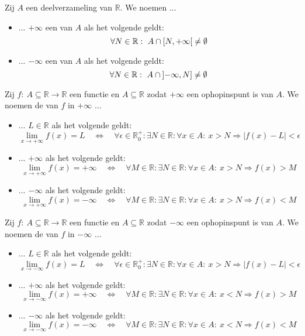 \documentclass[main.tex]{subfiles}
\begin{document}
\begin{de}
  Zij $A$ een deelverzameling van $\mathbb{R}$.
  We noemen ...
  \begin{itemize}
  \item ... $+\infty$ een  van $A$ als het volgende geldt:
    \[ \forall N \in \mathbb{R}:\ A \cap \interval[open right]{N}{+\infty} \neq \emptyset \]
  \item ... $-\infty$ een  van $A$ als het volgende geldt:
    \[ \forall N \in \mathbb{R}:\ A \cap \interval[open left]{-\infty}{N} \neq \emptyset \]
  \end{itemize}
\end{de}

\begin{de}
  Zij $f:\ A \subseteq \mathbb{R} \rightarrow \mathbb{R}$ een functie en $A \subseteq \mathbb{R}$ zodat $+\infty$ een ophopinspunt is van $A$.
  We noemen de  van $f$ in $+\infty$ ...
  \begin{itemize}
  \item ... $L\in \mathbb{R}$ als het volgende geldt:
    \[
    \lim_{x\rightarrow +\infty}f(x) = L \quad\Leftrightarrow\quad
    \forall \epsilon \in \mathbb{R}_{0}^{+}: \exists N \in \mathbb{R}: \forall x\in A:\ x > N \Rightarrow |f(x) - L| < \epsilon
    \]
  \item ... $+\infty$ als het volgende geldt:
    \[
    \lim_{x\rightarrow +\infty}f(x) = +\infty\quad\Leftrightarrow\quad
    \forall M \in \mathbb{R}: \exists N \in \mathbb{R}: \forall x\in A:\ x > N \Rightarrow f(x) > M
    \]
  \item ... $-\infty$ als het volgende geldt:
    \[
    \lim_{x\rightarrow +\infty}f(x) = -\infty\quad\Leftrightarrow\quad
    \forall M \in \mathbb{R}: \exists N \in \mathbb{R}: \forall x\in A:\ x > N \Rightarrow f(x) < M
    \]
  \end{itemize}
\end{de}

\begin{de}
  Zij $f:\ A \subseteq \mathbb{R} \rightarrow \mathbb{R}$ een functie en $A \subseteq \mathbb{R}$ zodat $-\infty$ een ophopinspunt is van $A$.
  We noemen de  van $f$ in $-\infty$ ...
  \begin{itemize}
  \item ... $L\in \mathbb{R}$ als het volgende geldt:
    \[
    \lim_{x\rightarrow -\infty}f(x) = L \quad\Leftrightarrow\quad
    \forall \epsilon \in \mathbb{R}_{0}^{+}: \exists N \in \mathbb{R}: \forall x\in A:\ x > N \Rightarrow |f(x) - L| < \epsilon
    \]
  \item ... $+\infty$ als het volgende geldt:
    \[
    \lim_{x\rightarrow -\infty}f(x) = +\infty\quad\Leftrightarrow\quad
    \forall M \in \mathbb{R}: \exists N \in \mathbb{R}: \forall x\in A:\ x < N \Rightarrow f(x) > M
    \]
  \item ... $-\infty$ als het volgende geldt:
    \[
    \lim_{x\rightarrow -\infty}f(x) = -\infty\quad\Leftrightarrow\quad
    \forall M \in \mathbb{R}: \exists N \in \mathbb{R}: \forall x\in A:\ x < N \Rightarrow f(x) < M
    \]
  \end{itemize}
\end{de}
\end{document}
